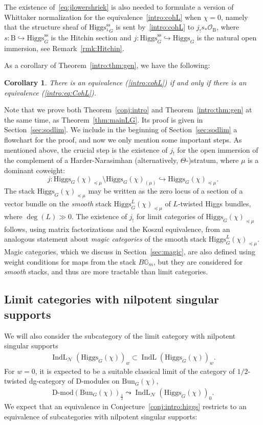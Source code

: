 \documentclass [11pt,oneside,a4paper,mathscr]{amsart}
\newtheorem{cor}[thm]{Corollary}
\theoremstyle{definition}
\newcommand{\IndL}{\operatorname{IndL}}
\newcommand{\Hig}{\mathrm{Higgs}}
\newcommand{\Bun}{\mathrm{Bun}}
\begin{document}
The existence of~\eqref{eq:jlowershriek} is also needed to formulate a version of Whittaker normalization for the equivalence~\eqref{intro:cohL} when $\chi=0$, namely that the structure sheaf of $\Hig_{{}^LG}^{\text{ss}}$ is sent by~\eqref{intro:cohL} to $j_!s_*\mathcal{O}_{\mathrm{B}}$, where $s\colon \mathrm{B}\hookrightarrow \Hig_{G}^{\mathrm{ss}}$ is the Hitchin section and $j\colon \Hig_{G}^{\mathrm{ss}}\hookrightarrow \Hig_{G}$ is the natural open immersion, see Remark~\ref{rmk:Hitchin}.

As a corollary of Theorem~\ref{intro:thm:gen}, we have the following: 
\begin{cor}\label{intro:cor:eq}
There is an equivalence (\ref{intro:cohL}) if and only if there is an equivalence (\ref{intro:eq:CohL}). 
\end{cor}


Note that we prove both Theorem~\ref{conj:intro} and Theorem~\ref{intro:thm:gen} at the same time, as Theorem~\ref{thm:mainLG}. Its proof is given in Section~\ref{sec:sodlim}. We include in the beginning of Section~\ref{sec:sodlim} a flowchart for the proof, and now we only mention some important steps.
As mentioned above, the crucial step is the existence of $j_!$ for the open immersion of the complement of a Harder-Narasimhan (alternatively, $\Theta$-)stratum, where $\mu$ is a dominant coweight:
\[j\colon \Hig_G(\chi)_{\preceq \mu}\setminus \Hig_G(\chi)_{(\mu)}\hookrightarrow \Hig_G(\chi)_{\preceq \mu}.\]
The stack $\Hig_G(\chi)_{\preceq \mu}$ may be written as the zero locus of a section of a vector bundle on the \textit{smooth} stack 
$\Hig^L_G(\chi)_{\preceq \mu}$ of $L$-twisted Higgs bundles, where $\deg(L)\gg 0$. The existence of $j_!$ 
for limit categories of $\Hig_G(\chi)_{\preceq \mu}$ follows, using matrix factorizations and the Koszul equivalence, from an analogous statement about \textit{magic categories} of the smooth stack $\Hig^L_G(\chi)_{\preceq \mu}$. Magic categories, which we discuss in Section~\ref{sec:magic}, are also defined using weight conditions for maps from the stack $B\mathbb{G}_m$, but they are considered for \textit{smooth} stacks, and thus are more tractable than limit categories.

\subsection{Limit categories with nilpotent singular supports}
We will also consider the subcategory of the limit category with nilpotent singular 
supports 
\begin{align*}
    \IndL_{\mathcal{N}}(\Hig_G(\chi))_w \subset \IndL(\Hig_G(\chi))_w.
\end{align*}
For $w=0$, it is expected to be a suitable classical limit of the category of 
$1/2$-twisted dg-category of D-modules on $\Bun_G(\chi)$, 
\begin{align*}
    \text{D-mod}(\Bun_G(\chi))_{\frac{1}{2}}\leadsto \IndL_{\mathcal{N}}(\Hig_G(\chi))_0.
\end{align*}
We expect that an equivalence in
Conjecture~\ref{conj:intro:higgs} restricts to an equivalence of subcategories with nilpotent 
singular supports: 
\end{document}
